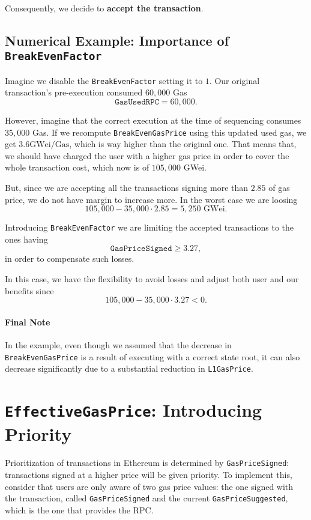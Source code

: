 Consequently, we decide to \textbf{accept the transaction}.


\subsection{Numerical Example: Importance of \texttt{BreakEvenFactor}}

Imagine we disable the \texttt{BreakEvenFactor} setting it to $1$. Our original transaction's pre-execution consumed $60,000$ Gas
\[
\texttt{GasUsedRPC} = 60,000.
\]

However, imagine that the correct execution at the time of sequencing consumes $35,000$ Gas. If we recompute \texttt{BreakEvenGasPrice} using this updated used gas, we get $3.6 \text{GWei/Gas}$, which is way higher than the original one. That means that, we should have charged the user with a higher gas price in order to cover the whole transaction cost, which now is of $105,000$ GWei.

But, since we are accepting all the transactions signing more than $2.85$ of gas price, we do not have margin to increase more. In the worst case we are loosing
\[
105,000 - 35,000 \cdot 2.85 = 5,250 \text{ GWei}.
\]

Introducing \texttt{BreakEvenFactor} we are limiting the accepted transactions to the ones having
\[
\texttt{GasPriceSigned} \geq 3.27,
\]
in order to compensate such losses.

In this case, we have the flexibility to avoid losses and adjust both user and our benefits since
\[
105,000 - 35,000 \cdot 3.27 < 0.
\]

\paragraph*{Final Note}
In the example, even though we assumed that the decrease in \texttt{BreakEvenGasPrice} is a result of executing with a correct state root, it can also decrease significantly due to a substantial reduction in \texttt{L1GasPrice}.





\section{\texttt{EffectiveGasPrice}: Introducing Priority}

Prioritization of transactions in Ethereum is determined by \texttt{GasPriceSigned}: transactions signed at a higher price will be given priority. To implement this, consider that users are only aware of two gas price values: the one signed with the transaction, called \texttt{GasPriceSigned} and the current \texttt{GasPriceSuggested}, which is the one that provides the RPC. 

